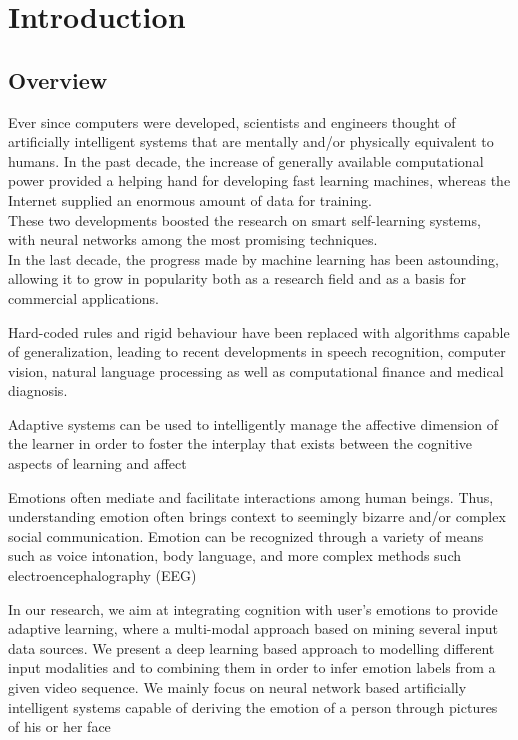 \chapter{Introduction}
\section{Overview}
Ever since computers were developed, scientists and engineers thought of artificially intelligent systems that are mentally and/or physically equivalent to humans. In the past decade, the increase of generally available computational power provided a helping hand for developing fast learning machines, whereas the Internet supplied an enormous amount of data for training.\\ 
These two developments boosted the research on smart self-learning systems, with neural networks among the most promising techniques.\\
In the last decade, the progress made by machine learning has been astounding, allowing it to grow in popularity both as a research field and as a basis for commercial applications.

Hard-coded rules and rigid behaviour have been replaced with algorithms capable of generalization, leading to recent developments in speech recognition, computer vision, natural language processing as well as computational finance and medical diagnosis.

Adaptive systems can be used to intelligently manage the affective dimension of the learner in order to foster the interplay that exists between the cognitive aspects of learning and affect

Emotions often mediate and facilitate interactions among human beings. Thus, understanding emotion often brings context to seemingly bizarre and/or complex social communication. Emotion can be recognized through a variety of means such as voice intonation, body language, and more complex methods such electroencephalography (EEG)

In our research,  we aim at integrating cognition with user’s emotions to provide adaptive learning, where a multi-modal approach based on mining several input data sources. We present a deep learning based approach to modelling different input modalities and to combining them in order to infer emotion labels from a given video sequence. We mainly focus on neural network based artificially intelligent systems capable of deriving the emotion of a person through pictures of his or her face

